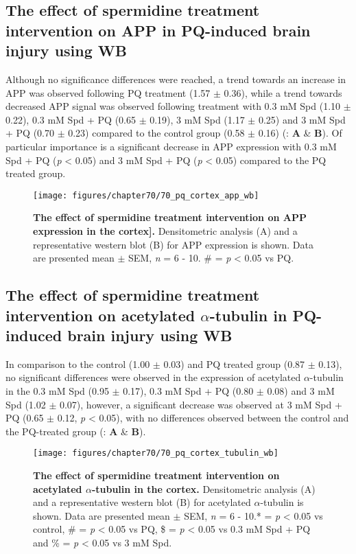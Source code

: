 \subsection{The effect of spermidine treatment intervention on APP in PQ-induced brain injury using WB}
Although no significance differences were reached, a trend towards an increase in APP was observed following PQ treatment (1.57 $\pm$ 0.36), while a trend towards decreased APP signal was observed following treatment with 0.3 mM Spd (1.10 $\pm$ 0.22), 0.3 mM Spd + PQ (0.65 $\pm$ 0.19), 3 mM Spd (1.17 $\pm$ 0.25) and 3 mM Spd + PQ (0.70 $\pm$ 0.23) compared to the control group (0.58 $\pm$ 0.16)  (: \textbf{A} \& \textbf{B}). Of particular importance is a significant decrease in APP expression with 0.3 mM Spd + PQ (\textit{p} < 0.05) and 3 mM Spd + PQ (\textit{p} < 0.05) compared to the PQ treated group. 

\begin{figure}[!htbp]
\center
  \texttt{[image: figures/chapter70/70\_pq\_cortex\_app\_wb]}
  \caption[The effect of spermidine treatment intervention on APP expression in the cortex]{\textbf{The effect of spermidine treatment intervention on APP expression in the cortex].} Densitometric analysis (A) and a representative western blot (B) for APP expression is shown. Data are presented  mean $\pm$ SEM, \textit{n} = 6 - 10. \# = \textit{p} < 0.05 vs PQ.}
  \label{fig:70_pq_cortex_app_wb}
\end{figure} 

\subsection{The effect of spermidine treatment intervention on acetylated $\alpha$-tubulin in PQ-induced brain injury using WB}
In comparison to the control (1.00 $\pm$ 0.03) and PQ treated group (0.87 $\pm$ 0.13), no significant differences were observed in the expression of acetylated $\alpha$-tubulin in the 0.3 mM Spd (0.95 $\pm$ 0.17), 0.3 mM Spd + PQ (0.80 $\pm$ 0.08) and 3 mM Spd (1.02 $\pm$ 0.07), however, a significant decrease was observed at 3 mM Spd + PQ (0.65 $\pm$ 0.12, \textit{p} < 0.05), with no differences observed between the control and the PQ-treated group (: \textbf{A} \& \textbf{B}). 

\begin{figure}[!htbp]
\center
  \texttt{[image: figures/chapter70/70\_pq\_cortex\_tubulin\_wb]}
  \caption[The effect of spermidine treatment intervention on acetylated $\alpha$-tubulin expression in the cortex]{\textbf{The effect of spermidine treatment intervention on acetylated $\alpha$-tubulin in the cortex.} Densitometric analysis (A) and a representative western blot (B) for acetylated $\alpha$-tubulin is shown. Data are presented  mean $\pm$ SEM, \textit{n} = 6 - 10.* = \textit{p} < 0.05 vs control, \# = \textit{p} < 0.05 vs PQ, \$ = \textit{p} < 0.05 vs 0.3 mM Spd + PQ and \% = \textit{p} < 0.05 vs 3 mM Spd.}
  \label{fig:70_pq_cortex_tubulin_wb}
\end{figure} 

